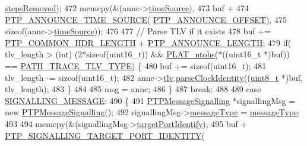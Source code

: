 \begin{DoxyCode}
{{{{{{{{      \hyperlink{class_p_t_p_message_announce_ab24df4cccbede4b07586878ef0d47395}{stepsRemoved});
472             memcpy(&(annc->\hyperlink{class_p_t_p_message_announce_a56fd97f48cb931b2450032650f82ef17}{timeSource}),
473                    buf +
474                    \hyperlink{avbts__message_8hpp_ac69e2a9341554bbbf10612cd50b5f181}{PTP\_ANNOUNCE\_TIME\_SOURCE}(
      \hyperlink{avbts__message_8hpp_aaa3da4fa4e9e4cfe49477cd7f6b95bca}{PTP\_ANNOUNCE\_OFFSET}),
475                    \textcolor{keyword}{sizeof}(annc->\hyperlink{class_p_t_p_message_announce_a56fd97f48cb931b2450032650f82ef17}{timeSource}));
476 
477             \textcolor{comment}{// Parse TLV if it exists}
478             buf += \hyperlink{avbts__message_8hpp_a8ec4d965b7b1e83844f1c17f12e9b8e4}{PTP\_COMMON\_HDR\_LENGTH} + 
      \hyperlink{avbts__message_8hpp_ad800b5cd5359d021054af8e902100ba7}{PTP\_ANNOUNCE\_LENGTH};
479             \textcolor{keywordflow}{if}( tlv\_length > (\textcolor{keywordtype}{int}) (2*\textcolor{keyword}{sizeof}(uint16\_t)) && \hyperlink{linux_2src_2platform_8cpp_a6b8f3e7b87b66fa774a07ddc67f883a7}{PLAT\_ntohs}(*((uint16\_t *)buf)) == 
      \hyperlink{avbts__message_8hpp_a10ec0e6a0943853c9deaf56616dbebf7}{PATH\_TRACE\_TLV\_TYPE})  \{
480                 buf += \textcolor{keyword}{sizeof}(uint16\_t);
481                 tlv\_length -= \textcolor{keyword}{sizeof}(uint16\_t);
482                 annc->\hyperlink{class_p_t_p_message_announce_ac7b185260086ad357ff7a9c29f468936}{tlv}.\hyperlink{class_path_trace_t_l_v_a66b71b1178893f98ba403e961e8fb6cf}{parseClockIdentity}((\hyperlink{stdint_8h_aba7bc1797add20fe3efdf37ced1182c5}{uint8\_t} *)buf, tlv\_length);
483             \}
484 
485             msg = annc;
486         \}
487         \textcolor{keywordflow}{break};
488 
489     \textcolor{keywordflow}{case} \hyperlink{avbts__message_8hpp_ac6606ebe91c8ac66a2c314c79f5ab013a126e822073ff23ccb061021926a152a3}{SIGNALLING\_MESSAGE}:
490         \{
491             \hyperlink{class_p_t_p_message_signalling}{PTPMessageSignalling} *signallingMsg = \textcolor{keyword}{new} 
      \hyperlink{class_p_t_p_message_signalling}{PTPMessageSignalling}();
492             signallingMsg->\hyperlink{class_p_t_p_message_common_adb32627aa5b0e2dbad3ccd88aab07c05}{messageType} = \hyperlink{class_p_t_p_message_common_adb32627aa5b0e2dbad3ccd88aab07c05}{messageType};
493 
494             memcpy(&(signallingMsg->\hyperlink{class_p_t_p_message_signalling_a1d4353212906ed7366ffbf01cb56bdab}{targetPortIdentify}),
495                    buf + \hyperlink{avbts__message_8hpp_a068292a37a4f0716f4b6ba81222fb9a5}{PTP\_SIGNALLING\_TARGET\_PORT\_IDENTITY}(
}}}}}}}}
\end{DoxyCode}
